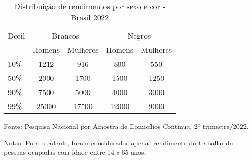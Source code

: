 \begin{table}[htb!]
    \centering
    \caption{Distribuição de rendimentos por sexo e cor - Brasil 2022}
    \begin{tabular}{lcccc}
    \hline
    Decil & \multicolumn{2}{c}{Brancos} & \multicolumn{2}{c}{Negros} \\ \cline{2-5} 
          & Homens      & Mulheres      & Homens      & Mulheres     \\ \hline
    10\%  & 1212        & 916           & 800         & 550          \\
    50\%  & 2000        & 1700          & 1500        & 1250         \\
    90\%  & 7500        & 5000          & 4000        & 3000         \\
    99\%  & 25000       & 17500         & 12000       & 9000         \\ \hline
    \end{tabular}
    \label{tab:decis}
    \begin{floatnotes}
      \item[Fonte:] Pesquisa Nacional por Amostra de Domicílios Contínua. 2º trimestre/2022.
      \item[Notas:] Para o cálculo, foram considerados apenas rendimento do trabalho de pessoas ocupadas com idade entre 14 e 65 anos.
  \end{floatnotes}
    \end{table}